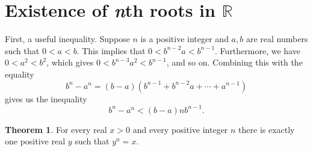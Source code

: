 \documentclass[12pt]{article}
\theoremstyle{definition}
\newtheorem{theorem}{Theorem}
\begin{document}
\section{Existence of \textit{n}th roots in \texorpdfstring{\(\mathbb{R}\)}{}}
\label{sec:existence_of_nth_roots_in_R}

First, a useful inequality. Suppose \( n \) is a positive integer and \( a, b \) are real numbers such that \( 0 < a < b \). This implies that \( 0 < b^{n-2}a < b^{n-1} \). Furthermore, we have \( 0 < a^2 < b^2 \), which gives \( 0 < b^{n-3}a^2 < b^{n-1} \), and so on. Combining this with the equality
\[
    b^n - a^n = (b - a)(b^{n-1} + b^{n-2}a + \cdots + a^{n-1})
\]
gives us the inequality
\[
    b^n - a^n < (b - a)nb^{n-1}. \tag{1}
\]

\begin{theorem}
\label{thm:existence_of_nth_roots_in_R}
    For every real \( x > 0 \) and every positive integer \( n \) there is exactly one positive real \( y \) such that \( y^n = x \).
\end{theorem}
\end{document}
